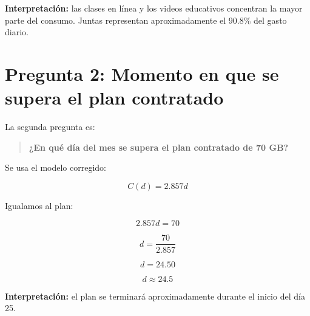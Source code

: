 \documentclass[12pt,a4paper]{article}
\begin{document}
	\textbf{Interpretación:} las clases en línea y los videos educativos concentran la mayor parte del consumo. Juntas representan aproximadamente el 90.8\% del gasto diario.
	
	\section{Pregunta 2: Momento en que se supera el plan contratado}
	
	La segunda pregunta es:
	
	\begin{quote}
		\textbf{¿En qué día del mes se supera el plan contratado de 70 GB?}
	\end{quote}
	
	Se usa el modelo corregido:
	
	\[
	C(d)=2.857d
	\]
	
	Igualamos al plan:
	
	\[
	2.857d=70
	\]
	
	\[
	d=\frac{70}{2.857}
	\]
	
	\[
	d=24.50
	\]
	
	\[
	\boxed{d\approx24.5}
	\]
	
	\textbf{Interpretación:} el plan se terminará aproximadamente durante el inicio del día 25.
	
\end{document}

